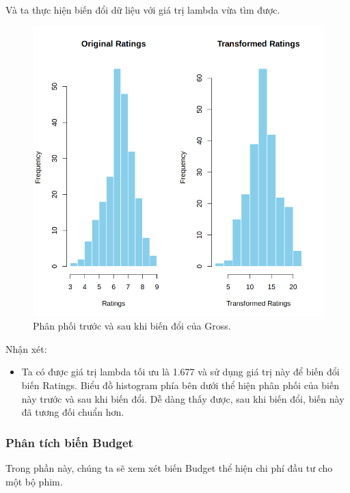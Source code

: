 Và ta thực hiện biến đổi dữ liệu với giá trị lambda vừa tìm được.
\begin{figure}[H]
    \centering
    \includegraphics[width=0.75\columnwidth]{csm_figures/ratings_transformed_distribution.png}
    \caption{Phân phối trước và sau khi biến đổi của Gross.}
    \label{fig:ratings_transformed_distribution}
\end{figure}
Nhận xét:
\begin{itemize}
    \item Ta có được giá trị lambda tối ưu là 1.677 và sử dụng giá trị này để biến đổi biến Ratings. Biểu đồ histogram phía bên dưới thể hiện phân phối của biến này trước và sau khi biến đổi. Dễ dàng thấy được, sau khi biến đổi, biến này đã tương đối chuẩn hơn.
\end{itemize}

\subsubsection{Phân tích biến Budget}

Trong phần này, chúng ta sẽ xem xét biến Budget thể hiện chi phí đầu tư cho một bộ phim.

